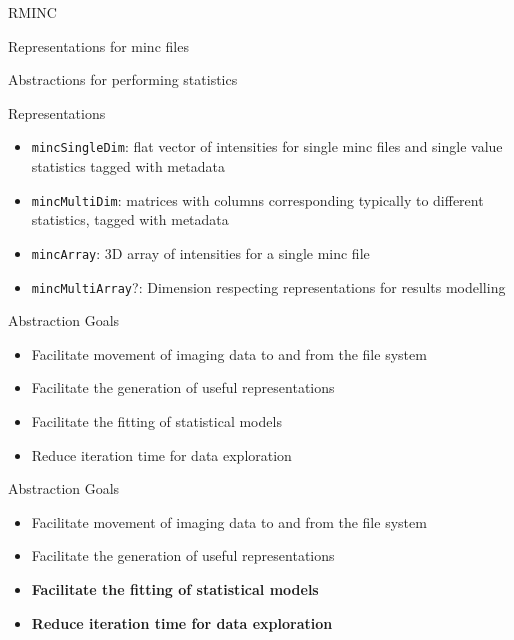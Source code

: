 \begin{frame}{RMINC}

\begin{block}{Representations for minc files}

\end{block}

\begin{block}{Abstractions for performing statistics}

\end{block}

\end{frame}

\begin{frame}{Representations}

\begin{itemize}
\tightlist
\item
  \texttt{mincSingleDim}: flat vector of intensities for single minc
  files and single value statistics tagged with metadata
\item
  \texttt{mincMultiDim}: matrices with columns corresponding typically
  to different statistics, tagged with metadata
\item
  \texttt{mincArray}: 3D array of intensities for a single minc file
\item
  \texttt{mincMultiArray}?: Dimension respecting representations for
  results modelling
\end{itemize}

\end{frame}

\begin{frame}{Abstraction Goals}

\begin{itemize}
\tightlist
\item
  Facilitate movement of imaging data to and from the file system
\item
  Facilitate the generation of useful representations
\item
  Facilitate the fitting of statistical models
\item
  Reduce iteration time for data exploration
\end{itemize}

\end{frame}

\begin{frame}{Abstraction Goals}

\begin{itemize}
\tightlist
\item
  Facilitate movement of imaging data to and from the file system
\item
  Facilitate the generation of useful representations
\item
  \textbf{Facilitate the fitting of statistical models}
\item
  \textbf{Reduce iteration time for data exploration}
\end{itemize}

\end{frame}

